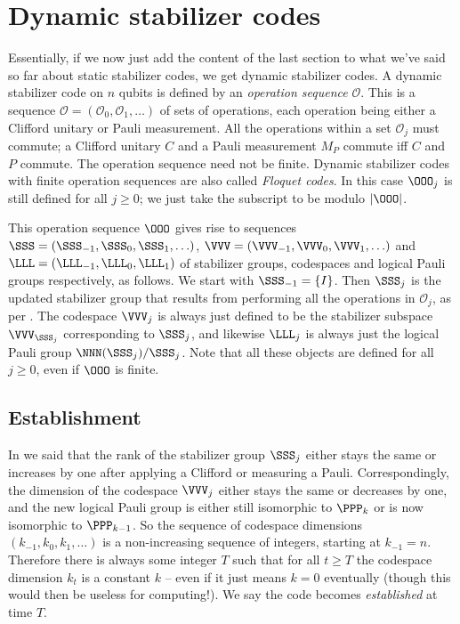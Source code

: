 \section{Dynamic stabilizer codes}\label{sec:dynamic-stabilizer-codes}

Essentially, if we now just add the content of the last section to what we've said so far about static stabilizer codes, we get dynamic stabilizer codes.
A dynamic stabilizer code on $n$ qubits is defined by an \textit{operation sequence} $\mathcal{O}$.
This is a sequence $\mathcal{O} = (\mathcal{O}_0, \mathcal{O}_1, \ldots)$ of sets of operations, each operation being either a Clifford unitary or Pauli measurement.
All the operations within a set $\mathcal{O}_j$ must commute; a Clifford unitary $C$ and a Pauli measurement $M_P$ commute iff $C$ and $P$ commute.
The operation sequence need not be finite.
Dynamic stabilizer codes with finite operation sequences are also called \textit{Floquet codes}.
In this case $\OOO_j$ is still defined for all $j \geq 0$; we just take the subscript to be modulo $|\OOO|$.

This operation sequence $\OOO$ gives rise to sequences $\SSS = (\SSS_{-1}, \SSS_0, \SSS_1, \ldots)$, $\VVV = (\VVV_{-1}, \VVV_0, \VVV_1, \ldots)$ and $\LLL = (\LLL_{-1}, \LLL_0, \LLL_1)$ of stabilizer groups, codespaces and logical Pauli groups respectively, as follows.
We start with $\SSS_{-1} = \{I\}$.
Then $\SSS_{j}$ is the updated stabilizer group that results from performing all the operations in $\mathcal{O}_j$, as per .
The codespace $\VVV_j$ is always just defined to be the stabilizer subspace $\VVV_{\SSS_j}$ corresponding to $\SSS_j$, and likewise $\LLL_j$ is always just the logical Pauli group $\NNN(\SSS_j)/\SSS_j$.
Note that all these objects are defined for all $j \geq 0$, even if $\OOO$ is finite.

\subsection{Establishment}

In  we said that the rank of the stabilizer group $\SSS_j$ either stays the same or increases by one after applying a Clifford or measuring a Pauli.
Correspondingly, the dimension of the codespace $\VVV_j$ either stays the same or decreases by one, and the new logical Pauli group is either still isomorphic to $\PPP_k$ or is now isomorphic to $\PPP_{k-1}$.
So the sequence of codespace dimensions $(k_{-1}, k_0, k_1, \ldots)$ is a non-increasing sequence of integers, starting at $k_{-1} = n$.
Therefore there is always some integer $T$ such that for all $t \geq T$ the codespace dimension $k_t$ is a constant $k$ -- even if it just means $k = 0$ eventually (though this would then be useless for computing!).
We say the code becomes \textit{established} at time $T$.

